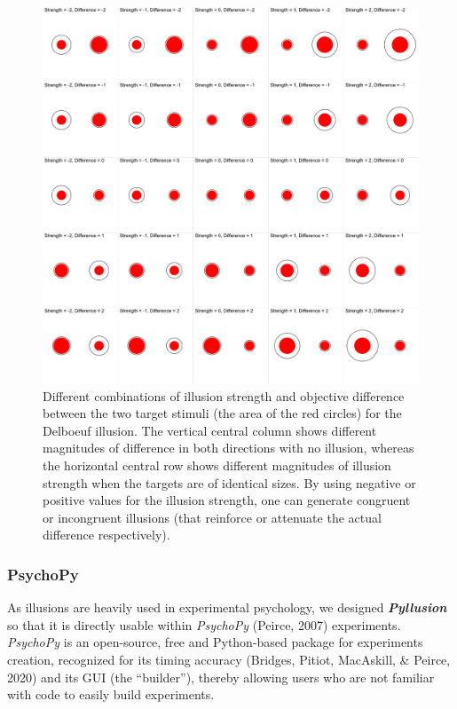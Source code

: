 \documentclass[
  english,
  man,floatsintext]{apa6}
\begin{document}
\begin{figure}
\includegraphics[width=1\linewidth]{figure4} \caption{Different combinations of illusion strength and objective difference between the two target stimuli (the area of the red circles) for the Delboeuf illusion. The vertical central column shows different magnitudes of difference in both directions with no illusion, whereas the horizontal central row shows different magnitudes of illusion strength when the targets are of identical sizes. By using negative or positive values for the illusion strength, one can generate congruent or incongruent illusions (that reinforce or attenuate the actual difference respectively).}\label{fig:unnamed-chunk-4}
\end{figure}

\hypertarget{psychopy}{%
\subsubsection{PsychoPy}\label{psychopy}}

As illusions are heavily used in experimental psychology, we designed \textbf{\emph{Pyllusion}} so that it is directly usable within \emph{PsychoPy} (Peirce, 2007) experiments. \emph{PsychoPy} is an open-source, free and Python-based package for experiments creation, recognized for its timing accuracy (Bridges, Pitiot, MacAskill, \& Peirce, 2020) and its GUI (the ``builder''), thereby allowing users who are not familiar with code to easily build experiments.
\end{document}

